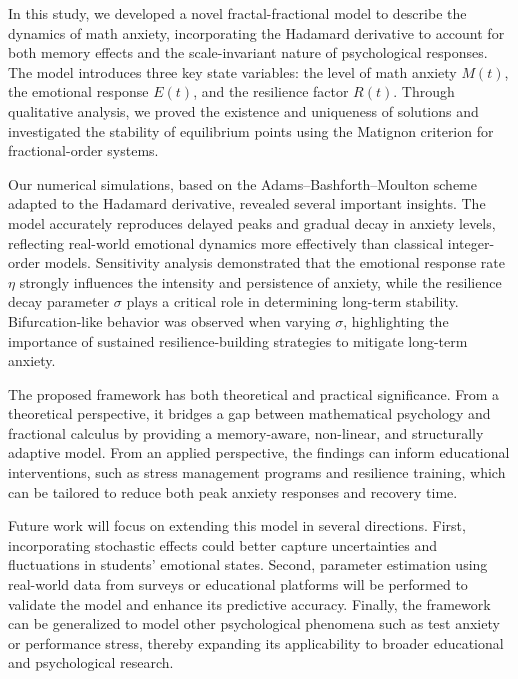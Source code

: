 \documentclass[10pt]{NSP1}
\begin{document}
\par\medskip{}\smallskip

In this study, we developed a novel fractal-fractional model to describe the dynamics of math anxiety, incorporating the Hadamard derivative to account for both memory effects and the scale-invariant nature of psychological responses. The model introduces three key state variables: the level of math anxiety \(M(t)\), the emotional response \(E(t)\), and the resilience factor \(R(t)\). Through qualitative analysis, we proved the existence and uniqueness of solutions and investigated the stability of equilibrium points using the Matignon criterion for fractional-order systems.

Our numerical simulations, based on the Adams–Bashforth–Moulton scheme adapted to the Hadamard derivative, revealed several important insights. The model accurately reproduces delayed peaks and gradual decay in anxiety levels, reflecting real-world emotional dynamics more effectively than classical integer-order models. Sensitivity analysis demonstrated that the emotional response rate \(\eta\) strongly influences the intensity and persistence of anxiety, while the resilience decay parameter \(\sigma\) plays a critical role in determining long-term stability. Bifurcation-like behavior was observed when varying \(\sigma\), highlighting the importance of sustained resilience-building strategies to mitigate long-term anxiety.

The proposed framework has both theoretical and practical significance. From a theoretical perspective, it bridges a gap between mathematical psychology and fractional calculus by providing a memory-aware, non-linear, and structurally adaptive model. From an applied perspective, the findings can inform educational interventions, such as stress management programs and resilience training, which can be tailored to reduce both peak anxiety responses and recovery time.

Future work will focus on extending this model in several directions. First, incorporating stochastic effects could better capture uncertainties and fluctuations in students’ emotional states. Second, parameter estimation using real-world data from surveys or educational platforms will be performed to validate the model and enhance its predictive accuracy. Finally, the framework can be generalized to model other psychological phenomena such as test anxiety or performance stress, thereby expanding its applicability to broader educational and psychological research.
\end{document}
